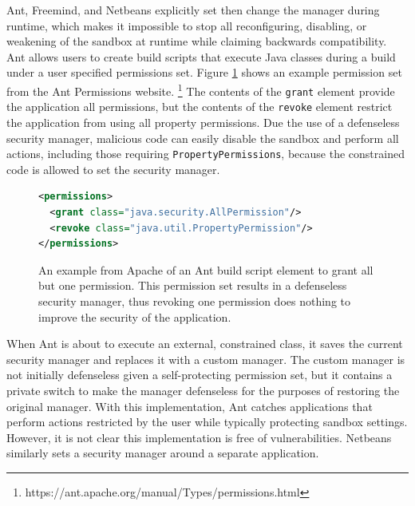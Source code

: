 \documentclass{sig-alternate}
\begin{document}

Ant, Freemind, and Netbeans explicitly set then change the manager
during runtime, which makes it impossible to stop all reconfiguring, disabling,
or weakening of the sandbox at runtime while claiming backwards
compatibility. Ant allows users to create build scripts that 
execute Java classes during a build under a user specified
permissions set. Figure \ref{fig:Ant Permissions Example}
shows an example permission set from the Ant Permissions website.%
\footnote{https://ant.apache.org/manual/Types/permissions.html%
} The contents of the \texttt{grant} element provide the application
all permissions, but the contents of the \texttt{revoke} element restrict
the application from using all property permissions. Due the use of a
defenseless security manager, malicious code can easily disable the sandbox and perform all actions,
including those requiring \texttt{PropertyPermissions}, because the constrained code is allowed to set the security manager.

\begin{figure}
\begin{lstlisting}[language=XML,basicstyle={\scriptsize}]
<permissions>   
  <grant class="java.security.AllPermission"/>   
  <revoke class="java.util.PropertyPermission"/> 
</permissions>
\end{lstlisting}

\caption{An example from Apache of an Ant build script element to grant all but one permission. This permission set results in a defenseless security manager, thus revoking one permission does nothing to improve the security of the application.}
\label{fig:Ant Permissions Example}
\end{figure}

When Ant is about to execute an external, constrained class, it saves the current security manager and replaces it with a custom manager. The custom manager is not initially defenseless given a self-protecting permission set, but it contains a private switch to make the manager defenseless for the purposes of restoring the original manager. With this implementation, Ant catches applications that perform actions
restricted by the user while typically protecting sandbox settings. However, it is not clear this implementation
is free of vulnerabilities. Netbeans similarly sets a security manager around a separate application.
\end{document}
